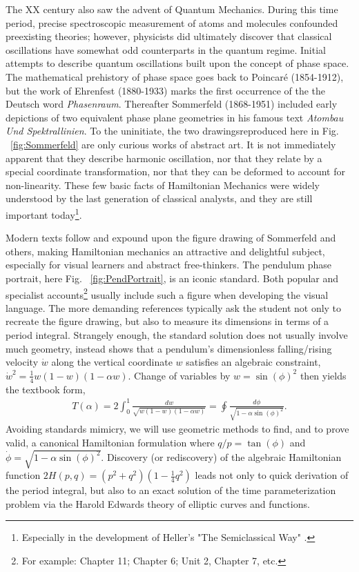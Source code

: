 \documentclass[nofootinbib,preprint]{revtex4-1}
\begin{document}
The XX century also saw the advent of Quantum Mechanics. During this time period, precise spectroscopic 
measurement of atoms and molecules confounded preexisting theories; however, physicists did ultimately 
discover that classical oscillations have 
somewhat odd counterparts in the quantum regime. Initial attempts to describe quantum oscillations 
built upon the concept of phase space. The mathematical prehistory of phase space goes back to Poincar\'{e} 
(1854-1912), but the work of Ehrenfest (1880-1933) marks the first occurrence of the the Deutsch 
word \textit{Phasenraum}\cite{NOLTE2010}. Thereafter Sommerfeld (1868-1951) included early depictions 
of two equivalent phase plane geometries in his famous text \textit{Atombau Und Spektrallinien}. 
To the uninitiate, the two drawings\textemdash reproduced here in Fig. ~\ref{fig:Sommerfeld}\textemdash 
are only curious works of abstract art. It is not immediately apparent that they describe harmonic 
oscillation, nor that they relate by a special coordinate transformation, nor that they can be deformed 
to account for non-linearity. These few basic facts of Hamiltonian Mechanics were widely understood by 
the last generation of classical analysts, and they are still important 
today\footnote{Especially in the development of Heller's "The Semiclassical Way" \cite{HELLER2018}.}. 

Modern texts follow and expound upon the figure drawing of Sommerfeld and others, making Hamiltonian
mechanics an attractive and delightful subject, especially for visual learners and abstract 
free-thinkers. The pendulum phase portrait, here Fig. ~\ref{fig:PendPortrait}, is an iconic standard. 
Both popular and specialist accounts\footnote{For example: \cite{STROGATZ2019} Chapter 11; \cite{STROGATZ2018} 
Chapter 6; \cite{HARTER2019} Unit 2, Chapter 7, etc.} usually include such a figure when developing the 
visual language. The more demanding references typically ask the student not only to recreate the figure 
drawing, but also to measure its dimensions in terms of a period integral. Strangely enough, the standard 
solution does not usually involve much geometry, instead shows that a pendulum's dimensionless falling/rising 
velocity $\dot{w}$ along the vertical coordinate $w$ satisfies an algebraic constraint, 
$\dot{w}^2=\frac{1}{4}w(1-w)(1-\alpha w)$. Change of variables by $w=\sin(\phi)^2$ then yields the 
textbook form, 
\begin{eqnarray}
T(\alpha) = 2 \int_{0}^{1} \frac{ dw}{\sqrt{w(1-w)(1-\alpha w)}} =
\oint \frac{ d\phi}{\sqrt{1-\alpha \sin(\phi)^2}} . \nonumber
\end{eqnarray}
Avoiding standards mimicry, we will use geometric methods to find, and to prove valid, a canonical 
Hamiltonian formulation where $q/p=\tan(\phi)$ and $\dot{\phi}=\sqrt{1-\alpha\sin(\phi)^2 }$. 
Discovery (or rediscovery) of the algebraic Hamiltonian function $2H(p,q)=(p^2+q^2)(1-\frac{1}{4}q^2)$ 
leads not only to quick derivation of the period integral, but also to an exact solution of the time 
parameterization problem via the Harold Edwards theory of elliptic curves and
functions.  
\end{document}

